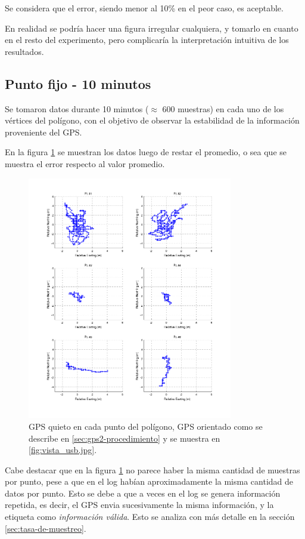 \documentclass[spanish,12pt,a4paper,titlepage]{report}
\begin{document}
Se considera que el error, siendo  menor al 10\% en el peor caso, es aceptable.

En realidad se podría hacer una figura irregular cualquiera, y tomarlo en cuanto en el resto del experimento, pero complicaría la interpretación intuitiva de los resultados.

\newpage
\subsection{Punto fijo - 10 minutos}
\label{sec:gps2-punto-fijo-10-minutos}

Se tomaron datos durante 10 minutos ($\approx$ 600 muestras) en cada uno de los vértices del polígono, con el objetivo de observar la estabilidad de la información proveniente del GPS.

En la figura \ref{fig:10min_grid.png} se muestran los datos luego de restar el promedio, o sea que se muestra el error respecto al valor promedio.

\begin{figure}[h!]
  \includegraphics[width=0.8\textwidth]{./img/10min_grid.png}
  \caption{GPS quieto en cada punto del polígono, GPS orientado como se describe en \ref{sec:gps2-procedimiento} y se muestra en \ref{fig:vista_usb.jpg}.}
  \label{fig:10min_grid.png}
\end{figure}

Cabe destacar que en la figura \ref{fig:10min_grid.png} no parece haber la misma cantidad de muestras por punto, pese a que en el log habían aproximadamente la misma cantidad de datos por punto. Esto se debe a que a veces en el log se genera información repetida, es decir, el GPS envia sucesivamente la misma información, y la etiqueta como \textit{información válida}. Esto se analiza con más detalle en la sección \ref{sec:tasa-de-muestreo}.
\end{document}
